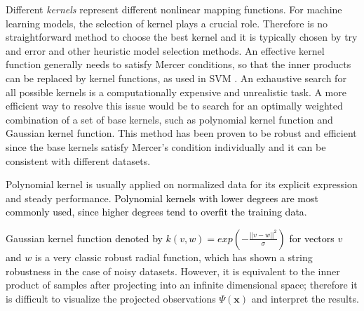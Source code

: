 Different \textit{kernels} represent different nonlinear mapping functions. For machine learning models, the selection of kernel plays a crucial role. Therefore is no straightforward method to choose the best kernel and it is typically chosen by try and error and other heuristic model selection methods. An effective kernel function generally needs to satisfy Mercer conditions, so that the inner products can be replaced by kernel functions, as used in SVM \cite{cristianini2000introduction}. 
An exhaustive search for all possible kernels is a computationally expensive and unrealistic task\cite{chapelle1999support}. A more efficient way to resolve this issue would be to search for an optimally weighted combination of a set of base kernels, such as polynomial kernel function and Gaussian kernel function\cite{lanckriet2002robust}. This method has been proven to be robust and efficient since the base kernels satisfy Mercer’s condition individually and it can be consistent with different datasets\cite{jebara2004multi}.


Polynomial kernel is usually applied on normalized data for its explicit expression and steady performance. \textcolor{black}{Polynomial kernels with lower degrees are most commonly used, since higher degrees tend to overfit the training data\cite{chang2010training}}.%

Gaussian kernel function \textcolor{black}{denoted by $k(v,w)=exp(-\frac{||v-w||^2}{\sigma})$ for vectors $v$ and $w$} is a very classic robust radial function, which has shown a string robustness in the case of noisy datasets\cite{carr2003smooth}. However, it is equivalent to the inner product of samples after projecting into an infinite dimensional space; therefore it is difficult to visualize the projected observations $\Psi(\mathbf{x})$ and interpret the results. %

